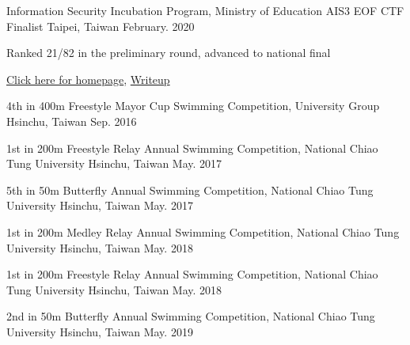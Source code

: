 \begin{cventries}
\cventry
    {Information Security Incubation Program, Ministry of Education} %
    {AIS3 EOF CTF Finalist} %
    {Taipei, Taiwan} %
    {February. 2020} %
    {
      \begin{cvitems} %
        \item {Ranked 21/82 in the preliminary round, advanced to national final}
        \item {\href{https://ais3.org/eof/Home/FinalResult}{Click here for homepage}, \href{https://github.com/Alfons0329/CS_Fall_2019/tree/master/Final_CTF}{Writeup}}
      \end{cvitems}
    }
\end{cventries}

\begin{cvhonors}

  \cvhonor
    {4th in 400m Freestyle} %
    {Mayor Cup Swimming Competition, University Group} %
    {Hsinchu, Taiwan} %
    {Sep. 2016} %

  \cvhonor
    {1st in 200m Freestyle Relay} %
    {Annual Swimming Competition, National Chiao Tung University} %
    {Hsinchu, Taiwan} %
    {May. 2017} %

  \cvhonor
    {5th in 50m Butterfly} %
    {Annual Swimming Competition, National Chiao Tung University} %
    {Hsinchu, Taiwan} %
    {May. 2017} %

  \cvhonor
    {1st in 200m Medley Relay} %
    {Annual Swimming Competition, National Chiao Tung University} %
    {Hsinchu, Taiwan} %
    {May. 2018} %
    
  \cvhonor
    {1st in 200m Freestyle Relay} %
    {Annual Swimming Competition, National Chiao Tung University} %
    {Hsinchu, Taiwan} %
    {May. 2018} %
    
  \cvhonor
    {2nd in 50m Butterfly} %
    {Annual Swimming Competition, National Chiao Tung University} %
    {Hsinchu, Taiwan} %
    {May. 2019} %
    
\end{cvhonors}
